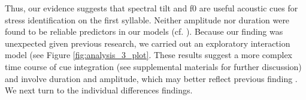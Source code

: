 Thus, our evidence suggests that spectral tilt and f0 are useful acoustic cues for stress identification on the first syllable. Neither amplitude nor duration were found to be reliable predictors in our models (cf. \cite{Alfano2006, Alfano2009, Tagliapietra2005}). Because our finding was unexpected given previous research, we carried out an exploratory interaction model (see Figure \ref{fig:analysis_3_plot}. These results suggest a more complex time course of cue integration (see supplemental materials for further discussion) and involve duration and amplitude, which may better reflect previous finding \cite{Alfano2006, Alfano2009, Tagliapietra2005}. We next turn to the individual differences findings.



